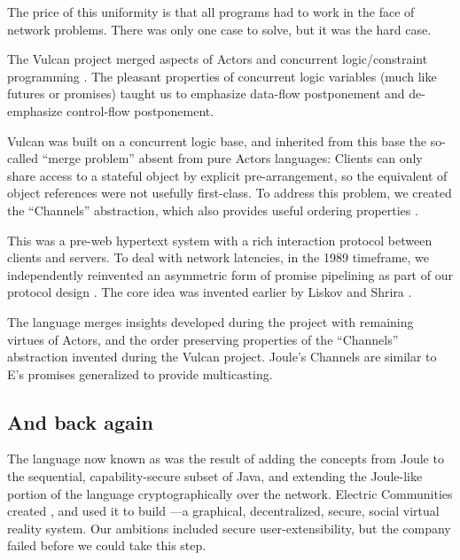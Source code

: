 \documentclass{llncs}
\begin{document}
The price of this uniformity is that all programs had to work
in the face of network problems. There was only one case to solve, but
it was the hard case.

 The Vulcan project \cite{kahn:vulcan}
merged aspects of Actors and concurrent logic/constraint programming
\cite{tr003,Saraswat93,janus}. The pleasant properties of concurrent
logic variables (much like futures or promises) taught us to emphasize
data-flow postponement and de-emphasize control-flow
postponement. 


Vulcan was built on a concurrent logic base, and inherited from this
base the so-called ``merge problem'' \cite{Shapiro:merge} absent from
pure Actors languages: Clients can only share access to a stateful
object by explicit pre-arrangement, so the equivalent of object
references were not usefully first-class. To address this problem, we
created the ``Channels'' abstraction, which also provides useful
ordering properties \cite{tribble:channels}.

 This was a
pre-web hypertext system with a rich interaction protocol between
clients and servers. To deal with network latencies, in the 1989
timeframe, we independently reinvented an asymmetric form of promise
pipelining as part of our protocol design \cite{gold:promises}. The
core idea was invented earlier by Liskov and Shrira
\cite{liskov:promises}.


 The  language \cite{tribble:joule}
merges insights developed during the  project with
remaining virtues of Actors, and the order preserving properties of
the ``Channels'' abstraction invented during the Vulcan
project. Joule's Channels are similar to E's promises generalized to
provide multicasting. 

\subsection{And back again}

 The language now known as
 was the result of adding the concepts from Joule to
the sequential, capability-secure subset of Java, and extending the
Joule-like portion of the language cryptographically over the
network. Electric Communities created , and used it to
build ---a graphical, decentralized, secure, social
virtual reality system. Our ambitions included secure
user-extensibility, but the company failed before we could take this
step.
\end{document}
